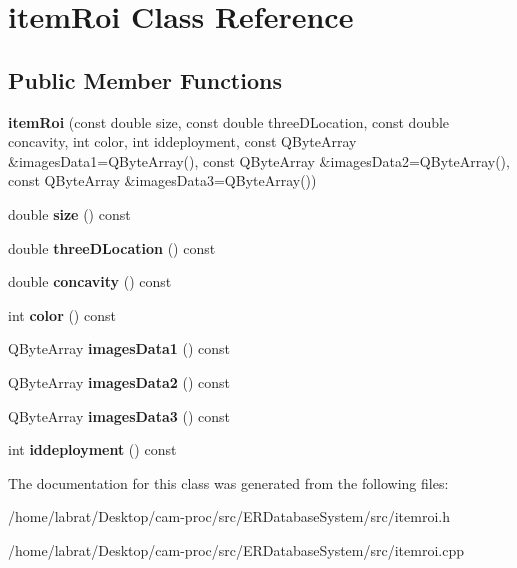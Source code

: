 \hypertarget{classitemRoi}{}\section{item\+Roi Class Reference}
\label{classitemRoi}
\subsection*{Public Member Functions}
\begin{DoxyCompactItemize}
\item 
{\bfseries item\+Roi} (const double size, const double three\+D\+Location, const double concavity, int color, int iddeployment, const Q\+Byte\+Array \&images\+Data1=Q\+Byte\+Array(), const Q\+Byte\+Array \&images\+Data2=Q\+Byte\+Array(), const Q\+Byte\+Array \&images\+Data3=Q\+Byte\+Array())\hypertarget{classitemRoi_ae73b0763b7cc0f07e0d54f7aa92e42d3}{}\label{classitemRoi_ae73b0763b7cc0f07e0d54f7aa92e42d3}

\item 
double {\bfseries size} () const \hypertarget{classitemRoi_ae05fd2acefea8ab8434f94ff87279331}{}\label{classitemRoi_ae05fd2acefea8ab8434f94ff87279331}

\item 
double {\bfseries three\+D\+Location} () const \hypertarget{classitemRoi_abb4c51da8f1a209a762ebfae041b6271}{}\label{classitemRoi_abb4c51da8f1a209a762ebfae041b6271}

\item 
double {\bfseries concavity} () const \hypertarget{classitemRoi_a0e243726bff89f888592adbc3b4e6949}{}\label{classitemRoi_a0e243726bff89f888592adbc3b4e6949}

\item 
int {\bfseries color} () const \hypertarget{classitemRoi_ae32960b7aa28d93daaa9b62831f016b3}{}\label{classitemRoi_ae32960b7aa28d93daaa9b62831f016b3}

\item 
Q\+Byte\+Array {\bfseries images\+Data1} () const \hypertarget{classitemRoi_acd53391d5c936a59be55460af39bb21f}{}\label{classitemRoi_acd53391d5c936a59be55460af39bb21f}

\item 
Q\+Byte\+Array {\bfseries images\+Data2} () const \hypertarget{classitemRoi_a4beb6176843dc63b7ff1b8556ac8ad9e}{}\label{classitemRoi_a4beb6176843dc63b7ff1b8556ac8ad9e}

\item 
Q\+Byte\+Array {\bfseries images\+Data3} () const \hypertarget{classitemRoi_ac62389ff0e10eb5370670f1a5882dc7c}{}\label{classitemRoi_ac62389ff0e10eb5370670f1a5882dc7c}

\item 
int {\bfseries iddeployment} () const \hypertarget{classitemRoi_a403a9c5e1acfa7bda09a957408d3dbbe}{}\label{classitemRoi_a403a9c5e1acfa7bda09a957408d3dbbe}

\end{DoxyCompactItemize}


The documentation for this class was generated from the following files\+:\begin{DoxyCompactItemize}
\item 
/home/labrat/\+Desktop/cam-\/proc/src/\+E\+R\+Database\+System/src/itemroi.\+h\item 
/home/labrat/\+Desktop/cam-\/proc/src/\+E\+R\+Database\+System/src/itemroi.\+cpp\end{DoxyCompactItemize}
